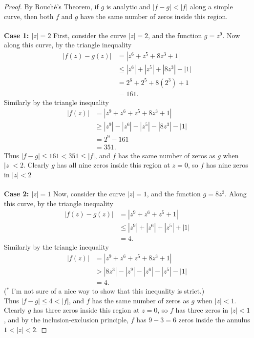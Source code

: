 \documentclass{article}
\begin{document}
\begin{proof}
  By Rouch\'e's Theorem, if $g$ is analytic and $|f - g| < |f|$ along a simple
  curve, then both $f$ and $g$ have the same number of zeros inside this region.
\\~\\
  \textbf{Case 1: $|z| = 2$} First, consider the curve $|z| = 2$, and the
  function $g = z^9$. Now along this curve, by the triangle inequality \begin{align*}
    |f(z) - g(z)| &= |z^6 + z^5 + 8z^3 + 1| \\
    &\leq |z^6| + |z^5| + |8z^3| + |1| \\
    &= 2^6 + 2^5 + 8(2^3) + 1 \\
    &= 161.
\end{align*}
Similarly by the triangle inequality \begin{align*}
  |f(z)| &= |z^9 + z^6 + z^5 + 8z^3 + 1| \\
  &\geq |z^9| - |z^6| - |z^5| - |8z^3| - |1| \\
  &= 2^9 - 161 \\
  &= 351.
\end{align*}
Thus $|f-g| \leq 161 < 351 \leq |f|$, and $f$ has the same number of zeros as
$g$ when $|z| < 2$. Clearly $g$ has all nine zeros inside this region at $z = 0$,
so $f$ has nine zeros in $|z| < 2$
\\~\\
\textbf{Case 2: $|z| = 1$} Now, consider the curve $|z| = 1$, and the
function $g = 8z^3$. Along this curve, by the triangle inequality \begin{align*}
  |f(z) - g(z)| &= |z^9 + z^6 + z^5 + 1| \\
  &\leq |z^9| + |z^6| + |z^5| + |1| \\
  &= 4.
\end{align*}
Similarly by the triangle inequality \begin{align*}
|f(z)| &= |z^9 + z^6 + z^5 + 8z^3 + 1| \\
&> |8z^3| - |z^9| - |z^6| - |z^5| - |1| \\
&= 4.
\end{align*} ($^*$ I'm not sure of a nice way to show that this inequality is strict.)\\
Thus $|f-g| \leq 4 < |f|$, and $f$ has the same number of zeros as
$g$ when $|z| < 1$. Clearly $g$ has three zeros inside this region at $z = 0$,
so $f$ has three zeros in $|z| < 1$, and by the inclusion-exclusion principle,
$f$ has $9 - 3 = 6$ zeros inside the annulus $1 < |z| < 2$.
\end{proof}
\pagebreak
\end{document}
